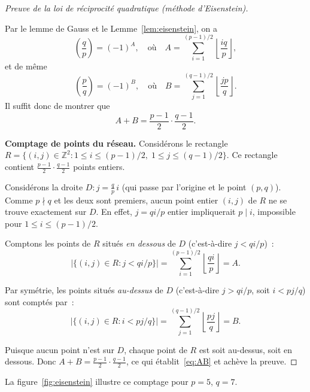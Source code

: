 \documentclass[12pt,a4paper,openany]{book}
\theoremstyle{definition}
\theoremstyle{plain}
\theoremstyle{remark}
\newcommand{\Z}{\mathbb{Z}}
\newcommand{\abs}[1]{\left|#1\right|}
\newcommand{\floor}[1]{\left\lfloor #1 \right\rfloor}
\newcommand{\legendre}[2]{\left(\frac{#1}{#2}\right)}
\begin{document}
\begin{proof}[Preuve de la loi de réciprocité quadratique (méthode d'Eisenstein)]
\label{proof:qr}

Par le lemme de Gauss et le Lemme~\ref{lem:eisenstein}, on a
\[
  \legendre{q}{p} = (-1)^{A}, \quad \text{où} \quad
  A = \sum_{i=1}^{(p-1)/2} \floor{\frac{iq}{p}},
\]
et de même
\[
  \legendre{p}{q} = (-1)^{B}, \quad \text{où} \quad
  B = \sum_{j=1}^{(q-1)/2} \floor{\frac{jp}{q}}.
\]
Il suffit donc de montrer que
\begin{equation}
\label{eq:AB}
  A + B = \frac{p-1}{2} \cdot \frac{q-1}{2}.
\end{equation}

\textbf{Comptage de points du réseau.}
Considérons le rectangle
$R = \{(i, j) \in \Z^2 : 1 \leq i \leq (p-1)/2, \; 1 \leq j \leq (q-1)/2\}$.
Ce rectangle contient $\frac{p-1}{2} \cdot \frac{q-1}{2}$ points entiers.

Considérons la droite $D : j = \frac{q}{p} \, i$ (qui passe par l'origine et
le point $(p, q)$). Comme $p \nmid q$ et les deux sont premiers, aucun point
entier $(i, j)$ de $R$ ne se trouve exactement sur $D$. En effet, $j = qi/p$
entier impliquerait $p \mid i$, impossible pour $1 \leq i \leq (p-1)/2$.

Comptons les points de $R$ situés \emph{en dessous} de $D$ (c'est-à-dire
$j < qi/p$)~:
\[
  \abs{\{(i, j) \in R : j < qi/p\}} = \sum_{i=1}^{(p-1)/2} \floor{\frac{qi}{p}} = A.
\]

Par symétrie, les points situés \emph{au-dessus} de $D$ (c'est-à-dire $j > qi/p$,
soit $i < pj/q$) sont comptés par~:
\[
  \abs{\{(i, j) \in R : i < pj/q\}} = \sum_{j=1}^{(q-1)/2} \floor{\frac{pj}{q}} = B.
\]

Puisque aucun point n'est sur $D$, chaque point de $R$ est soit au-dessus, soit
en dessous. Donc $A + B = \frac{p-1}{2} \cdot \frac{q-1}{2}$,
ce qui établit~\eqref{eq:AB} et achève la preuve.
\end{proof}

\bigskip

La figure~\ref{fig:eisenstein} illustre ce comptage pour $p = 5$, $q = 7$.
\end{document}
